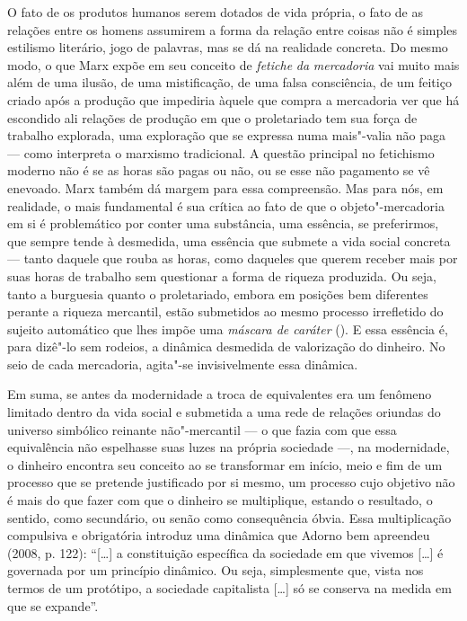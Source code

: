 O fato de os produtos humanos serem dotados de vida própria, o fato de
as relações entre os homens assumirem a forma da relação entre coisas
não é simples estilismo literário, jogo de palavras, mas se dá na
realidade concreta. Do mesmo modo, o que Marx expõe em seu conceito de
\emph{fetiche} \emph{da} \emph{mercadoria} vai muito mais além de uma
ilusão, de uma mistificação, de uma falsa consciência, de um feitiço
criado após a produção que impediria àquele que compra a mercadoria ver
que há escondido ali relações de produção em que o proletariado tem sua
força de trabalho explorada, uma exploração que se expressa numa
mais"-valia não paga --- como interpreta o marxismo tradicional. A questão
principal no fetichismo moderno não é se as horas são pagas ou não, ou
se esse não pagamento se vê enevoado. Marx também dá margem para essa
compreensão. Mas para nós, em realidade, o mais fundamental é sua
crítica ao fato de que o objeto"-mercadoria em si é problemático por
conter uma substância, uma essência, se preferirmos, que sempre tende à
desmedida, uma essência que submete a vida social concreta --- tanto
daquele que rouba as horas, como daqueles que querem receber mais por
suas horas de trabalho sem questionar a forma de riqueza produzida. Ou seja,
tanto a burguesia quanto o proletariado, embora em posições bem
diferentes perante a riqueza mercantil, estão submetidos ao mesmo
processo irrefletido do sujeito automático que lhes impõe uma
\emph{máscara de caráter} (). E essa essência é, para dizê"-lo sem
rodeios, a dinâmica desmedida de valorização do dinheiro. No seio de
cada mercadoria, agita"-se invisivelmente essa dinâmica.

Em suma, se antes da modernidade a troca de equivalentes era um fenômeno
limitado dentro da vida social e submetida a uma rede de relações
oriundas do universo simbólico reinante não"-mercantil --- o que fazia com
que essa equivalência não espelhasse suas luzes na própria sociedade ---,
na modernidade, o dinheiro encontra seu conceito ao se transformar em
início, meio e fim de um processo que se pretende justificado por si
mesmo, um processo cujo objetivo não é mais do que fazer com que o
dinheiro se multiplique, estando o resultado, o sentido, como
secundário, ou senão como consequência óbvia. Essa multiplicação
compulsiva e obrigatória introduz uma dinâmica que Adorno bem apreendeu
(2008, p. 122): ``[\ldots{}] a constituição específica da sociedade em
que vivemos [\ldots{}] é governada por um princípio dinâmico. Ou seja,
simplesmente que, vista nos termos de um protótipo, a sociedade
capitalista [\ldots{}] só se conserva na medida em que se expande''.

